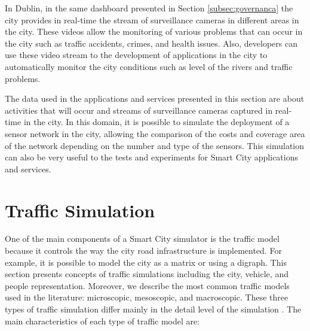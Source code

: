 In Dublin, in the same dashboard presented in Section \ref{subsec:governanca} the city provides in real-time the stream of surveillance cameras in different areas in the city. These videos allow the monitoring of various problems that can occur in the city such as traffic accidents, crimes, and health issues. Also, developers can use these video stream to the development of applications in the city to automatically monitor the city conditions such as level of the rivers and traffic problems.

The data used in the applications and services presented in this section are about activities that will occur and streams of surveillance cameras captured in real-time in the city. In this domain, it is possible to simulate the deployment of a sensor network in the city, allowing the comparison of the costs and coverage area of the network depending on the number and type of the sensors. This simulation can also be very useful to the tests and experiments for Smart City applications and services. 

\section{Traffic Simulation}
\label{sec:simulacaoTransito}

One of the main components of a Smart City simulator is the traffic model because it controls the way the city road infrastructure is implemented. For example, it is possible to model the city as a matrix or using a digraph. This section presents concepts of traffic simulations including the city, vehicle, and people representation. Moreover, we describe the most common traffic models used in the literature: microscopic, mesoscopic, and macroscopic. These three types of traffic simulation differ mainly in the detail level of the simulation \cite{barcelo2010fundamentals}. The main characteristics of each type of traffic model are:

